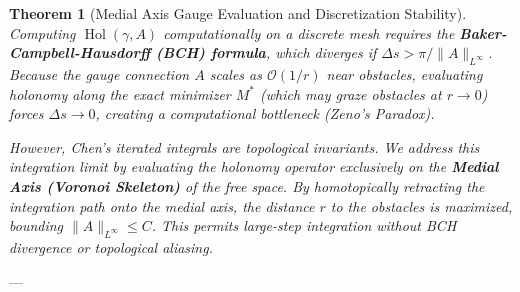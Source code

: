 \documentclass[11pt,reqno]{amsart}
\newtheorem{theorem}{Theorem}[section]
\theoremstyle{definition}
\numberwithin{equation}{section}
\begin{document}
\begin{theorem}[Medial Axis Gauge Evaluation and Discretization Stability]
Computing $\operatorname{Hol}(\gamma, A)$ computationally on a discrete mesh requires the \textbf{Baker-Campbell-Hausdorff (BCH) formula}, which diverges if $\Delta s > \pi / \|A\|_{L^\infty}$. Because the gauge connection $A$ scales as $\mathcal{O}(1/r)$ near obstacles, evaluating holonomy along the exact minimizer $M^*$ (which may graze obstacles at $r \to 0$) forces $\Delta s \to 0$, creating a computational bottleneck (Zeno's Paradox).

However, Chen's iterated integrals are topological invariants. We address this integration limit by evaluating the holonomy operator exclusively on the \textbf{Medial Axis (Voronoi Skeleton)} of the free space. By homotopically retracting the integration path onto the medial axis, the distance $r$ to the obstacles is maximized, bounding $\|A\|_{L^\infty} \le C$. This permits large-step integration without BCH divergence or topological aliasing.
\end{theorem}

---
\end{document}
